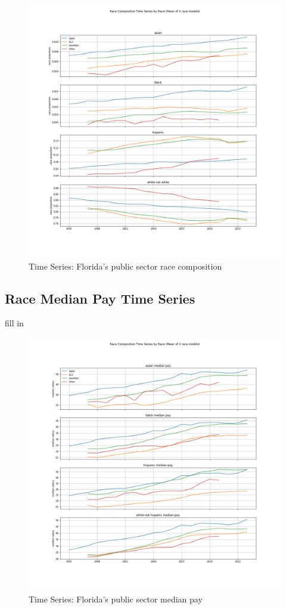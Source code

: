 \begin{figure}[H]
\begin{center}
\includegraphics[width=5.5in]{Figures/race_composition_ts.png}
\caption{Time Series: Florida's public sector race composition}
\label{styleResponse}
\end{center}
\end{figure}


\subsection{Race Median Pay Time Series}
fill in


\begin{figure}[H]
\begin{center}
\includegraphics[width=5.5in]{Figures/median_salary_ts.png}
\caption{Time Series: Florida's public sector median pay}
\label{styleResponse}
\end{center}
\end{figure}
